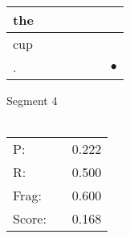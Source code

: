 \documentclass[landscape]{article}
\newcommand{\ssp}{\hspace{2pt}}
\newcommand{\mex}{\cellcolor{g}$\bullet$}
\begin{document}
\begin{tabular}{|l|p{10pt}|p{10pt}|p{10pt}|p{10pt}|p{10pt}|p{10pt}|}
\hline
\ssp the \ssp&\hspace{2pt}&\hspace{2pt}&\hspace{2pt}&\hspace{2pt}&\hspace{2pt}&\hspace{2pt}\\
\hline
\ssp cup \ssp&\hspace{2pt}&\hspace{2pt}&\hspace{2pt}&\hspace{2pt}&\hspace{2pt}&\hspace{2pt}\\
\hline
\ssp \cellcolor{ref5}. \ssp&\hspace{2pt}&\hspace{2pt}&\hspace{2pt}&\hspace{2pt}&\hspace{2pt}&\hspace{2pt}\mex\\
\hline
\end{tabular}

\vspace{6pt}
\noindent Segment 4\\\\
\noindent\begin{tabular}{lm{12pt}r}
\hline
P:&&0.222\\
R:&&0.500\\
Frag:&&0.600\\
Score:&&0.168\\
\end{tabular}

\newpage
\end{document}
